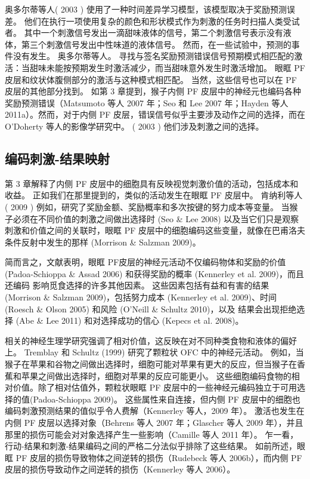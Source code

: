 奥多尔蒂等人( 2003 ) 使用了一种时间差异学习模型，该模型取决于奖励预测误差。 他们在执行一项使用复杂的颜色和形状模式作为刺激的任务时扫描人类受试者。 其中一个刺激信号发出一滴甜味液体的信号，第二个刺激信号表示没有液体，第三个刺激信号发出中性味道的液体信号。 然而，在一些试验中，预测的事件没有发生。 奥多尔蒂等人。 寻找与签名奖励预测错误信号预期模式相匹配的激活：当甜味未能按预期发生时激活减少，而当甜味意外发生时激活增加。 眼眶 PF 皮层和纹状体腹侧部分的激活与这种模式相匹配。
当然，这些信号也可以在 PF 皮层的其他部分找到。 如第 3 章提到，猴子内侧 PF 皮层中的神经元也编码各种奖励预测错误（Matsumoto 等人 2007 年；Seo 和 Lee 2007 年；Hayden 等人 2011a）。然而，对于内侧 PF 皮层，错误信号似乎主要涉及动作之间的选择，而在 O'Doherty 等人的影像学研究中。 ( 2003 ) 他们涉及刺激之间的选择。\par
\subsection{编码刺激-结果映射}
第 3 章解释了内侧 PF 皮层中的细胞具有反映视觉刺激价值的活动，包括成本和收益。 正如我们在那里提到的，类似的活动发生在眼眶 PF 皮层中。 肯纳利等人( 2009 ) 例如，研究了奖励金额、奖励概率和多次按键的努力成本等变量。 当猴子必须在不同价值的刺激之间做出选择时 (Seo \& Lee 2008) 以及当它们只是观察刺激和价值之间的关联时，眼眶 PF 皮层中的细胞编码这些变量，就像在巴甫洛夫条件反射中发生的那样 (Morrison \& Salzman 2009)。\par
简而言之，文献表明，眼眶 PF皮层的神经元活动不仅编码物体和奖励的价值 (Padoa-Schioppa \& Assad 2006) 和获得奖励的概率 (Kennerley et al. 2009)，而且还编码 影响觅食选择的许多其他因素。 这些因素包括有益和有害的结果 (Morrison \& Salzman 2009)，包括努力成本 (Kennerley et al. 2009)、时间 (Roesch \& Olson 2005) 和风险 (O'Neill \& Schultz 2010)，以及 结果会出现拒绝选择 (Abe \& Lee 2011) 和对选择成功的信心 (Kepecs et al. 2008)。\par
相关的神经生理学研究强调了相对价值，这反映在对不同种类食物和液体的偏好上。 Tremblay 和 Schultz (1999) 研究了颗粒状 OFC 中的神经元活动。 例如，当猴子在苹果和谷物之间做出选择时，细胞可能对苹果有更大的反应，但当猴子在香蕉和苹果之间做出选择时，细胞对苹果的反应可能更小。 这些细胞编码食物的相对价值。除了相对估值外，颗粒状眼眶 PF 皮层中的一些神经元编码独立于可用选择的值(Padoa-Schioppa 2009)。
这些属性来自连接，但内侧 PF 皮层中的细胞也编码刺激预测结果的值似乎令人费解（Kennerley 等人，2009 年）。 激活也发生在内侧 PF 皮层以选择对象（Behrens 等人 2007 年；Glascher 等人 2009 年），并且那里的损伤可能会对对象选择产生一些影响（Camille 等人 2011 年）。 乍一看，行动-结果和刺激-结果编码之间的严格二分法似乎排除了这些结果。 如前所述，眼眶 PF 皮层的损伤导致物体之间逆转的损伤（Rudebeck 等人 2006b），而内侧 PF 皮层的损伤导致动作之间逆转的损伤（Kennerley 等人 2006）。\par
